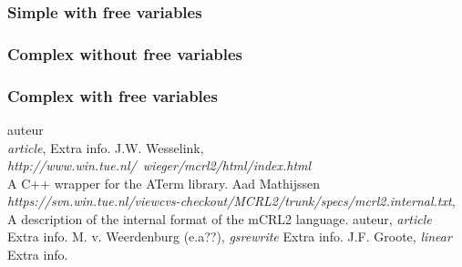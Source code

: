 \index{}\documentclass[a4paper,10pt]{article}
\theoremstyle{plain}
\theoremstyle{definition}
\begin{document}
\subsubsection{Simple with free variables}

\subsubsection{Complex without free variables}

\subsubsection{Complex with free variables}

\newpage
\begin{thebibliography}{99}   auteur\\
   \textit{article},
   Extra info.
   J.W. Wesselink,
   \textit{http://www.win.tue.nl/~wieger/mcrl2/html/index.html}\\
   A C++ wrapper for the ATerm library.
    Aad Mathijssen\\
   \textit{https://svn.win.tue.nl/viewcvs-checkout/MCRL2/trunk/specs/mcrl2.internal.txt},
   A description of the internal format of the mCRL2 language.
   auteur,
   \textit{article}
   Extra info.
   M. v. Weerdenburg (e.a??),
   \textit{gsrewrite}
   Extra info.
   J.F. Groote,
   \textit{linear}
   Extra info.

\end{thebibliography}

\newpage
\end{document}
